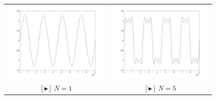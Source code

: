 \begin{figure}[h]
    \centering
    \begin{tabular}{cc}
        \includegraphics[scale=.18]{square_approx_1.png} & \includegraphics[scale=.18]{square_approx_5.png}\\
        \href{https://drive.google.com/file/d/1diLp3-edz0a5noPDrmdPAtLcfE1o02Mp/view?usp=sharing}{\color{blue} $[\blacktriangleright]~N = 1$} & \href{https://drive.google.com/file/d/1KRsDdJmrIZBzw05e9aXTSJ6JNP48DeH_/view?usp=sharing}{\color{blue}$[\blacktriangleright]~N = 5$}\\

\end{tabular}
\end{figure}
